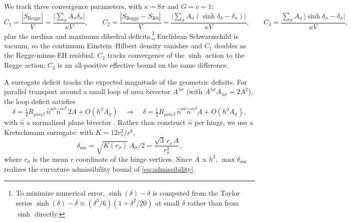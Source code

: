 \documentclass[11pt,letterpaper]{article}
\begin{document}
We track three convergence parameters, with $\kappa=8\pi$ and $G=c=1$:
\begin{equation}
C_{1}=\frac{|S_{\mathrm{Regge}}|}{V}=\frac{\bigl|\sum_{\sigma}A_{\sigma}\delta_{\sigma}\bigr|}{\kappa V},\qquad
C_{2}=\frac{|S_{\mathrm{Regge}}-S_{\mathrm{RS}}|}{V}=\frac{\bigl|\sum_{\sigma}A_{\sigma}(\sinh\delta_{\sigma}-\delta_{\sigma})\bigr|}{\kappa V},\qquad
C_{3}=\frac{\sum_{\sigma}A_{\sigma}\,|\sinh\delta_{\sigma}-\delta_{\sigma}|}{\kappa V},
\label{eq:cdefs}
\end{equation}
plus the median and maximum dihedral deficits.\footnote{To minimize numerical error, $\sinh(\delta)-\delta$ is computed from the Taylor series $\sinh(\delta)-\delta\approx(\delta^{3}/6)(1+\delta^{2}/20)$ at small $\delta$ rather than from $\sinh$ directly.} Euclidean Schwarzschild is vacuum, so the continuum Einstein--Hilbert density vanishes and $C_{1}$ doubles as the Regge-minus-EH residual. $C_{2}$ tracks convergence of the $\sinh$ action to the Regge action; $C_{3}$ is an all-positive effective bound on the same difference.

A surrogate deficit tracks the expected magnitude of the geometric deficits. For parallel transport around a small loop of area bivector $A^{\lambda\sigma}$ (with $A^{\lambda\sigma}A_{\lambda\sigma}=2A^{2}$), the loop deficit satisfies
\begin{equation}
\delta=\tfrac{1}{4}R_{\mu\nu\alpha\beta}\,\hat{n}^{\mu\nu}\hat{n}^{\alpha\beta}\,2A+O(h^{3}A_{\sigma})
\quad\Longrightarrow\quad
\delta=\tfrac{1}{2}R_{\mu\nu\alpha\beta}\,\hat{n}^{\mu\nu}\hat{n}^{\alpha\beta}A+O(h^{3}A_{\sigma}),
\label{eq:loopdeficit}
\end{equation}
with $\hat{n}$ a normalized plane bivector \cite{Hamber}. Rather than construct $\hat{n}$ per hinge, we use a Kretschmann surrogate: with $K=12r_{s}^{2}/r^{6}$,
\begin{equation}
\delta_{\mathrm{sur}}=\sqrt{K(r_{\sigma})}\,A_{\sigma}/2=\frac{\sqrt{3}\,r_{s}\,A}{r_{\sigma}^{3}},
\label{eq:surrogate}
\end{equation}
where $r_{\sigma}$ is the mean $r$ coordinate of the hinge vertices. Since $A\propto h^{2}$, $\max\delta_{\mathrm{sur}}$ realizes the curvature admissibility bound of \eqref{eq:admissibility}.
\end{document}
